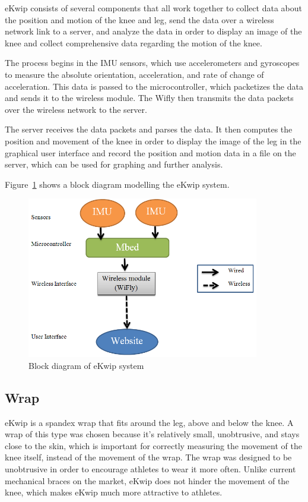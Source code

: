 eKwip consists of several components that all work together to collect data about the position and motion of the knee and leg, send the data over a wireless network link to a server, and analyze the data in order to display an image of the knee and collect comprehensive data regarding the motion of the knee.

The process begins in the IMU sensors, which use accelerometers and gyroscopes to measure the absolute orientation, acceleration, and rate of change of acceleration. This data is passed to the microcontroller, which packetizes the data and sends it to the wireless module. The Wifly then transmits the data packets over the wireless network to the server.

The server receives the data packets and parses the data. It then computes the position and movement of the knee in order to display the image of the leg in the graphical user interface and record the position and motion data in a file on the server, which can be used for graphing and further analysis.

Figure~\ref{fig:block_diagram} shows a block diagram modelling the eKwip system.

\begin{figure}[h]
  \begin{center}
    \includegraphics[width=4in]{images/block_diagram.PNG}
  \end{center}
  \caption{Block diagram of eKwip system}
  \label{fig:block_diagram}
\end{figure}

\subsection {Wrap}
eKwip is a spandex wrap that fits around the leg, above and below the knee. A wrap of this type was chosen because it's relatively small, unobtrusive, and stays close to the skin, which is important for correctly measuring the movement of the knee itself, instead of the movement of the wrap. The wrap was designed to be unobtrusive in order to encourage athletes to wear it more often. Unlike current mechanical braces on the market, eKwip does not hinder the movement of the knee, which makes eKwip much more attractive to athletes.


